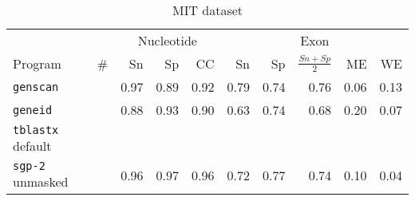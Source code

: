 \begin{table}[!ht]
\caption{MIT dataset}
\label{tbl:mit}
\begin{center}
\begin{tabular}{|l|r|rrr|rrr|rr|}
\hline
& & \multicolumn{3}{c|}{Nucleotide} & \multicolumn{5}{c|}{Exon} \\
Program & \# & Sn & Sp & CC & Sn & Sp & $\frac{Sn+Sp}{2}$ & ME & WE \\
\hline
{\tt genscan} &  & 0.97 & 0.89 & 0.92 & 0.79 & 0.74 & 0.76 & 0.06 & 0.13 \\
{\tt geneid} &  & 0.88 & 0.93 & 0.90 & 0.63 & 0.74 & 0.68 & 0.20 & 0.07 \\
\hline
{\tt tblastx} default   &  &  &  &  &  & &  &  &  \\
\hline
{\tt sgp-2} unmasked
&  & 0.96 & 0.97 & 0.96 & 0.72 & 0.77 & 0.74 & 0.10 & 0.04 \\
\hline
\end{tabular}
\end{center}
\end{table}

